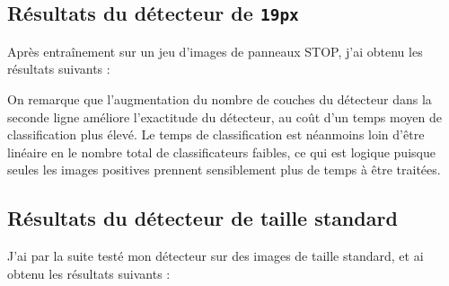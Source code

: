 \documentclass[12pt,a4paper]{article}
\begin{document}
\subsection{Résultats du détecteur de \texttt{19px}}
Après entraînement sur un jeu d'images de panneaux STOP, j'ai obtenu les résultats suivants :
\renewcommand{\arraystretch}{1.3}
\begin{table}[h]
    
\end{table}

On remarque que l'augmentation du nombre de couches du détecteur dans la seconde ligne améliore l'exactitude du détecteur, au coût d'un temps moyen de classification plus élevé. Le temps de classification est néanmoins loin d'être linéaire en le nombre total de classificateurs faibles, ce qui est logique puisque seules les images positives prennent sensiblement plus de temps à être traitées.

\subsection{Résultats du détecteur de taille standard}
\label{sec:results-standard}
J'ai par la suite testé mon détecteur sur des images de taille standard, et ai obtenu les résultats suivants :
\renewcommand{\arraystretch}{1.3}
\begin{table}[h]
    
\end{table}
\end{document}

